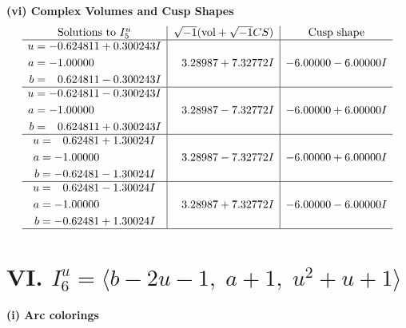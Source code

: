 \documentclass[1p]{elsarticle_modified}
\theoremstyle{definition}
\newcommand{\I}{\sqrt{-1}}
\begin{document}
\newpage\flushleft \textbf{(vi) Complex Volumes and Cusp Shapes}
$$\begin{array}{c|c|c}  
\text{Solutions to }I^u_{5}& \I (\text{vol} + \sqrt{-1}CS) & \text{Cusp shape}\\
 \hline 
\begin{aligned}
u &= -0.624811 + 0.300243 I \\
a &= -1.00000\phantom{ +0.000000I} \\
b &= \phantom{-}0.624811 - 0.300243 I\end{aligned}
 & \phantom{-}3.28987 + 7.32772 I & -6.00000 - 6.00000 I \\ \hline\begin{aligned}
u &= -0.624811 - 0.300243 I \\
a &= -1.00000\phantom{ +0.000000I} \\
b &= \phantom{-}0.624811 + 0.300243 I\end{aligned}
 & \phantom{-}3.28987 - 7.32772 I & -6.00000 + 6.00000 I \\ \hline\begin{aligned}
u &= \phantom{-}0.62481 + 1.30024 I \\
a &= -1.00000\phantom{ +0.000000I} \\
b &= -0.62481 - 1.30024 I\end{aligned}
 & \phantom{-}3.28987 - 7.32772 I & -6.00000 + 6.00000 I \\ \hline\begin{aligned}
u &= \phantom{-}0.62481 - 1.30024 I \\
a &= -1.00000\phantom{ +0.000000I} \\
b &= -0.62481 + 1.30024 I\end{aligned}
 & \phantom{-}3.28987 + 7.32772 I & -6.00000 - 6.00000 I\\
 \hline 
 \end{array}$$\newpage\newpage\renewcommand{\arraystretch}{1}
\centering \section*{VI. $I^u_{6}= \langle b-2 u-1,\;a+1,\;u^2+u+1 \rangle$}
\flushleft \textbf{(i) Arc colorings}\\
\end{document}
